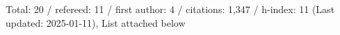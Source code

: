 Total: 20 / refereed: 11 / first author: 4 / citations: 1,347 / h-index: 11 (Last updated: 2025-01-11), List attached below